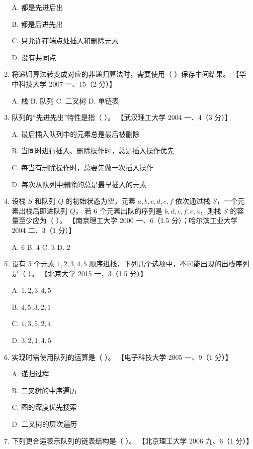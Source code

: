 \documentclass[lang=cn,newtx,10pt,scheme=chinese]{../../elegantbook}
\begin{document}
\begin{enumerate}
    A. 都是先进后出  

    B. 都是后进先出  

    C. 只允许在端点处插入和删除元素  

    D. 没有共同点  

    \item 将递归算法转变成对应的非递归算法时，需要使用（ ）保存中间结果。  
    【华中科技大学 2007 一、15（2 分）】  

    A. 栈 \quad B. 队列 \quad C. 二叉树 \quad D. 单链表  

    \item 队列的“先进先出”特性是指（ ）。  
    【武汉理工大学 2004 一、4（3 分）】  

    A. 最后插入队列中的元素总是最后被删除  

    B. 当同时进行插入、删除操作时，总是插入操作优先  

    C. 每当有删除操作时，总要先做一次插入操作  

    D. 每次从队列中删除的总是最早插入的元素  

    \item 设栈 $S$ 和队列 $Q$ 的初始状态为空，元素 $a, b, c, d, e, f$ 依次通过栈 $S$，一个元素出栈后即进队列 $Q$，
    若 6 个元素出队的序列是 $b, d, c, f, e, a$，则栈 $S$ 的容量至少应为（ ）。  
    【南京理工大学 2000 一、6（1.5 分）；哈尔滨工业大学 2004 二、3（1 分）】

    A. $6$ \quad B. $4$ \quad C. $3$ \quad D. $2$  

    \item 设有 5 个元素 $1, 2, 3, 4, 5$ 顺序进栈，下列几个选项中，不可能出现的出栈序列是（ ）。  
    【北京大学 2015 一、3（1.5 分）】  

    A. $1,2,3,4,5$  

    B. $4,5,3,2,1$ 

    C. $1,3,5,2,4$  

    D. $3,2,1,4,5$  

    \item 实现时需使用队列的运算是（ ）。  
    【电子科技大学 2005 一、9（1 分）】  

    A. 递归过程  

    B. 二叉树的中序遍历  

    C. 图的深度优先搜索 

    D. 二叉树的层次遍历  

    \item 下列更合适表示队列的链表结构是（ ）。  
    【北京理工大学 2006 九、6（1 分）】  


\end{enumerate}
\end{document}
